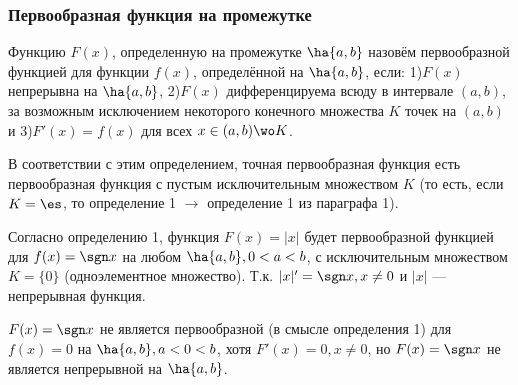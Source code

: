 \documentclass[a4paper]{article}
\begin{document}
\subsubsection{Первообразная функция на промежутке}
\begin{df*}
  Функцию $F(x)$, определенную на промежутке $\ha{a,b}$ назовём
  первообразной функцией для функции $f(x)$, определённой на $\ha{a,b}$,
  если: 1)$F(x)$ непрерывна на $\ha{a,b}$, 2)$F(x)$ дифференцируема
  всюду в интервале $(a,b)$, за возможным исключением некоторого
  конечного множества $K$ точек на $(a,b)$ и 3)$F'(x)=f(x)$ для всех
  $x\in(a,b)\wo K$.
\end{df*}
\begin{note}
  В соответствии с этим определением, точная первообразная функция
  есть первообразная функция с пустым исключительным множеством $K$
  (то есть, если $K=\es$, то определение 1 $\rightarrow$
  определение 1 из параграфа 1).
\end{note}
 Согласно определению 1, функция $F(x)=|x|$ будет
первообразной функцией для $f(x)=\sgn x$ на любом $\ha{a,b}, 0<a<b$,
с исключительным множеством $K=\{0\}$ (одноэлементное множество).
Т.к. $|x|'=\sgn x, x \ne 0$ и $|x|$ --- непрерывная функция.
\begin{note}
  $F(x)=\sgn x$ не является первообразной (в смысле определения 1)
  для $f(x)=0$ на $\ha{a,b}, a<0<b$, хотя $F'(x)=0, x\ne0$, но
  $F(x)=\sgn x$ не является непрерывной на $\ha{a,b}$.
\end{note}
\end{document}
